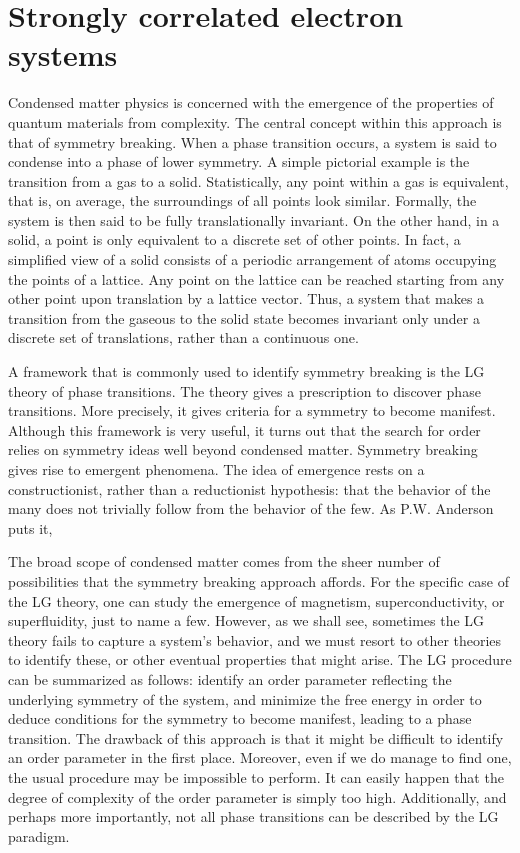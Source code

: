 \section{Strongly correlated electron systems}
\label{sec:strongly_correlated}

Condensed matter physics is concerned with the emergence of the properties of quantum materials from complexity.
The central concept within this approach is that of symmetry breaking.
When a phase transition occurs, a system is said to condense into a phase of lower symmetry.
A simple pictorial example is the transition from a gas to a solid.
Statistically, any point within a gas is equivalent, that is, on average, the surroundings of all points look similar.
Formally, the system is then said to be fully translationally invariant.
On the other hand, in a solid, a point is only equivalent to a discrete set of other points.
In fact, a simplified view of a solid consists of a periodic arrangement of atoms occupying the points of a lattice.
Any point on the lattice can be reached starting from any other point upon translation by a lattice vector.
Thus, a system that makes a transition from the gaseous to the solid state becomes invariant only under a discrete set of translations, rather than a continuous one. 

A framework that is commonly used to identify symmetry breaking is the \ac{LG} theory of phase transitions.
The theory gives a prescription to discover phase transitions.
More precisely, it gives criteria for a symmetry to become manifest.
Although this framework is very useful, it turns out that the search for order relies on symmetry ideas well beyond condensed matter.
Symmetry breaking gives rise to emergent phenomena.
The idea of emergence rests on a constructionist, rather than a reductionist hypothesis: that the behavior of the many does not trivially follow from the behavior of the few.
As P.W. Anderson puts it,  \cite{anderson_more_1972}

The broad scope of condensed matter comes from the sheer number of possibilities that the symmetry breaking approach affords.
For the specific case of the \acs{LG} theory, one can study the emergence of magnetism, superconductivity, or superfluidity, just to name a few.
However, as we shall see, sometimes the \acs{LG} theory fails to capture a system's behavior, and we must resort to other theories to identify these, or other eventual properties that might arise.
The \acl{LG} procedure can be summarized as follows: identify an order parameter reflecting the underlying symmetry of the system, and minimize the free energy in order to deduce conditions for the symmetry to become manifest, leading to a phase transition.
The drawback of this approach is that it might be difficult to identify an order parameter in the first place.
Moreover, even if we do manage to find one, the usual procedure may be impossible to perform.
It can easily happen that the degree of complexity of the order parameter is simply too high.
Additionally, and perhaps more importantly, not all phase transitions can be described by the LG paradigm.

